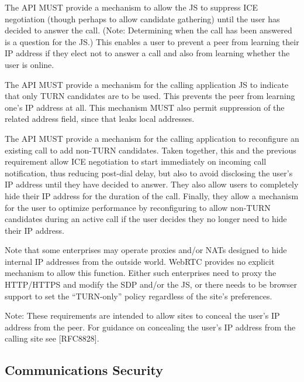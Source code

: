 \documentclass{article}
\begin{document}
\begin{description}[style=nextline]
\item[API Requirement:] The API MUST provide a mechanism to allow the JS to
  suppress ICE negotiation (though perhaps to allow candidate
  gathering) until the user has decided to answer the call.  (Note:
  Determining when the call has been answered is a question for the
  JS.)  This enables a user to prevent a peer from learning their IP
  address if they elect not to answer a call and also from learning
  whether the user is online.

\item[API Requirement:] The API MUST provide a mechanism for the calling
  application JS to indicate that only TURN candidates are to be
  used.  This prevents the peer from learning one's IP address at
  all.  This mechanism MUST also permit suppression of the related
  address field, since that leaks local addresses.

\item[API Requirement:] The API MUST provide a mechanism for the calling
  application to reconfigure an existing call to add non-TURN
  candidates.  Taken together, this and the previous requirement
  allow ICE negotiation to start immediately on incoming call
  notification, thus reducing post-dial delay, but also to avoid
  disclosing the user's IP address until they have decided to
  answer.  They also allow users to completely hide their IP address
  for the duration of the call.  Finally, they allow a mechanism for
  the user to optimize performance by reconfiguring to allow non-TURN candidates during an active call if the user decides they no
  longer need to hide their IP address.
\end{description}

Note that some enterprises may operate proxies and/or NATs designed
to hide internal IP addresses from the outside world.  WebRTC
provides no explicit mechanism to allow this function.  Either such
enterprises need to proxy the HTTP/HTTPS and modify the SDP and/or
the JS, or there needs to be browser support to set the ``TURN-only''
policy regardless of the site's preferences.

Note: These requirements are intended to allow sites to conceal the
user's IP address from the peer.  For guidance on concealing the
user's IP address from the calling site see [RFC8828].

\subsection{Communications Security}
\label{sec:communications-security}
\end{document}
